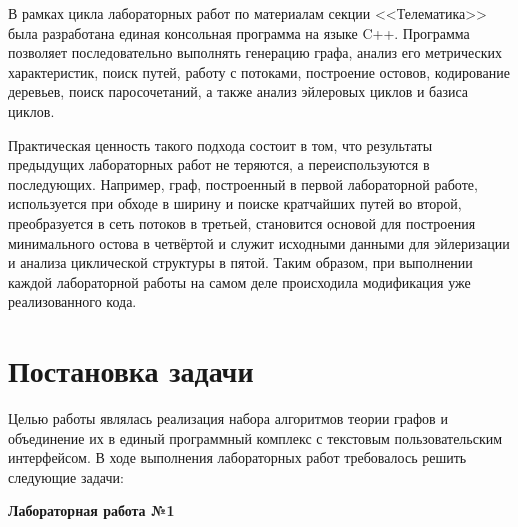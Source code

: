 \documentclass[14pt,a4paper]{extarticle}
\newcommand{\code}[1]{\texttt{#1}}
\begin{document}
В рамках цикла лабораторных работ по материалам секции <<Телематика>> \cite{tele} была разработана единая консольная программа на языке C++. Программа позволяет последовательно выполнять генерацию графа, анализ его метрических характеристик, поиск путей, работу с потоками, построение остовов, кодирование деревьев, поиск паросочетаний, а также анализ эйлеровых циклов и базиса циклов.

Практическая ценность такого подхода состоит в том, что результаты предыдущих лабораторных работ не теряются, а переиспользуются в последующих. Например, граф, построенный в первой лабораторной работе, используется при обходе в ширину и поиске кратчайших путей во второй, преобразуется в сеть потоков в третьей, становится основой для построения минимального остова в четвёртой и служит исходными данными для эйлеризации и анализа циклической структуры в пятой. Таким образом, при выполнении каждой лабораторной работы на самом деле происходила модификация уже реализованного кода.


\newpage
\section{Постановка задачи}

Целью работы являлась реализация набора алгоритмов теории графов и объединение их в единый программный комплекс с текстовым пользовательским интерфейсом. В ходе выполнения лабораторных работ требовалось решить следующие задачи:

\textbf{Лабораторная работа №1}
\end{document}

